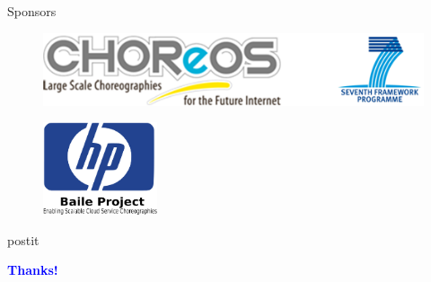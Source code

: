 \documentclass[xcolor=svgnames]{beamer}
\begin{document}



  \begin{frame}{Sponsors}
	\begin{figure}[!h]
	    \centering
	    \includegraphics[scale=0.6]{CHOReOSProject.png}
	\end{figure}

	\begin{figure}[!h]
	    \centering
	    \includegraphics[width=0.3\textwidth]{hp_logo_2.png}
	\end{figure}


  \end{frame}

    \begin{frame}%

	\begin{beamercolorbox}[sep=2em,wd=12cm]{postit}
	    \begin{center}
	      {\Huge \textbf{\textcolor{blue}{Thanks!}}}		
	    \end{center}
	\end{beamercolorbox}

    \end{frame}
\end{document}
